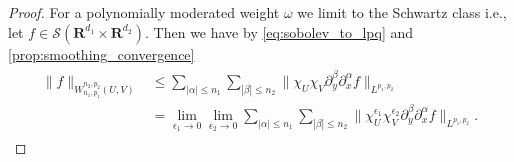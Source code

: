 \documentclass[a4paper]{article}
\newcommand{\rr}[1]{\mathbf{R}^{#1}}
\newcommand{\rrI}{\rr{d_1}}
\newcommand{\rrII}{\rr{d_2}}
\newcommand{\rrIxII}{\rrI\times\rrII}
\newcommand{\norm}[2]{\|#1\|_{#2}}
\newcommand{\chF}[1]{\chi_{#1}}
\newcommand{\chEF}[2]{\chF{#1}^{#2}}
\numberwithin{equation}{section}
\theoremstyle{remark}
\begin{document}
\begin{proof}
    For a polynomially moderated weight $\omega$ we limit to the Schwartz class
    i.e., let $f \in \mathscr{S}(\rrIxII)$.
    Then we have by \cref{eq:sobolev_to_lpq} and \cref{prop:smoothing_convergence}
\begin{align}
    \label{eq:sobolev_to_sequence}
    \begin{split}
        \norm{f}{W_{n_1,p_1}^{n_2, p_2}(U, V)}
        &\leq\sum_{|\alpha|\leq n_1}\sum_{|\beta|\leq n_2}\norm{\chF{U}\chF{V}\partial_y^\beta\partial_x^\alpha f}{L^{p_1,p_2}}
        \\
        &=\lim_{\epsilon_1\to 0}\lim_{\epsilon_2\to 0}\sum_{|\alpha|\leq n_1}\sum_{|\beta|\leq n_2}
        \norm{\chEF{U}{\epsilon_1}\chEF{V}{\epsilon_2}\partial_y^\beta\partial_x^\alpha f}{L^{p_1,p_2}}.
    \end{split}
\end{align}


\end{proof}
\end{document}
